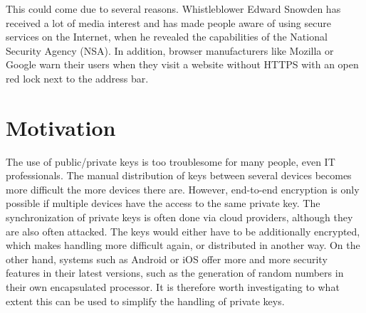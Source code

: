 \documentclass[12pt,oneside,a4paper,parskip]{scrbook}
\begin{document}
This could come due to several reasons. Whistleblower Edward Snowden has received a lot of media interest and has made people aware of using secure services on the Internet, when he revealed the capabilities of the National Security Agency (NSA). In addition, browser manufacturers like Mozilla or Google warn their users when they visit a website without HTTPS with an open red lock next to the address bar.


\section{Motivation}

The use of public/private keys is too troublesome for many people, even IT professionals. The manual distribution of keys between several devices becomes more difficult the more devices there are. However, end-to-end encryption is only possible if multiple devices have the access to the same private key. The synchronization of private keys is often done via cloud providers, although they are also often attacked. The keys would either have to be additionally encrypted, which makes handling more difficult again, or distributed in another way. On the other hand, systems such as Android or iOS offer more and more security features in their latest versions, such as the generation of random numbers in their own encapsulated processor. It is therefore worth investigating to what extent this can be used to simplify the handling of private keys.




\end{document}
